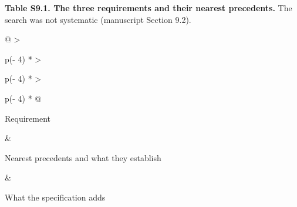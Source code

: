 \documentclass[
  11pt,
]{article}
\begin{document}
\begin{table}[!b]
\textbf{Table S9.1. The three requirements and their nearest
precedents.} The search was not systematic (manuscript Section 9.2).\par\smallskip
{\footnotesize
\begin{tabular}{@{}
  >{\raggedright\arraybackslash}p{(\columnwidth - 4\tabcolsep) * }
  >{\raggedright\arraybackslash}p{(\columnwidth - 4\tabcolsep) * }
  >{\raggedright\arraybackslash}p{(\columnwidth - 4\tabcolsep) * }@{}}
\toprule\noalign{}
\begin{minipage}[b]{\linewidth}\raggedright
Requirement
\end{minipage} & \begin{minipage}[b]{\linewidth}\raggedright
Nearest precedents and what they establish
\end{minipage} & \begin{minipage}[b]{\linewidth}\raggedright
What the specification adds
\end{minipage} \\
\midrule\noalign{}


\end{tabular}}
\end{table}
\end{document}
